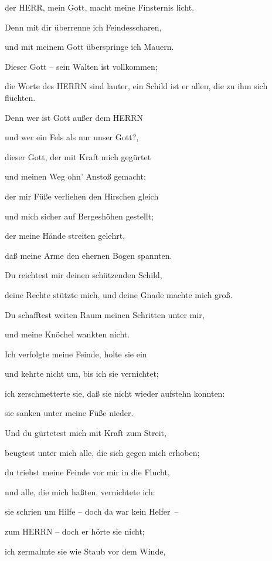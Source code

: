 der HERR, mein Gott, macht meine Finsternis licht.

Denn mit dir überrenne ich Feindesscharen,

und mit meinem Gott überspringe ich Mauern.

Dieser Gott -- sein Walten ist vollkommen;

die Worte des HERRN sind lauter, ein Schild ist er allen, die zu ihm
sich flüchten.

Denn wer ist Gott außer dem HERRN

und wer ein Fels als nur unser Gott?,

dieser Gott, der mit Kraft mich gegürtet

und meinen Weg ohn' Anstoß gemacht;

der mir Füße verliehen den Hirschen gleich

und mich sicher auf Bergeshöhen gestellt;

der meine Hände streiten gelehrt,

daß meine Arme den ehernen Bogen spannten.

Du reichtest mir deinen schützenden Schild,

deine Rechte stützte mich, und deine Gnade machte mich groß.

Du schafftest weiten Raum meinen Schritten unter mir,

und meine Knöchel wankten nicht.

Ich verfolgte meine Feinde, holte sie ein

und kehrte nicht um, bis ich sie vernichtet;

ich zerschmetterte sie, daß sie nicht wieder aufstehn
konnten:

sie sanken unter meine Füße nieder.

Und du gürtetest mich mit Kraft zum Streit,

beugtest unter mich alle, die sich gegen mich erhoben;

du triebst meine Feinde vor mir in die Flucht,

und alle, die mich haßten, vernichtete ich:

sie schrien um Hilfe -- doch da war kein Helfer~--

zum HERRN -- doch er hörte sie nicht;

ich zermalmte sie wie Staub vor dem Winde,


